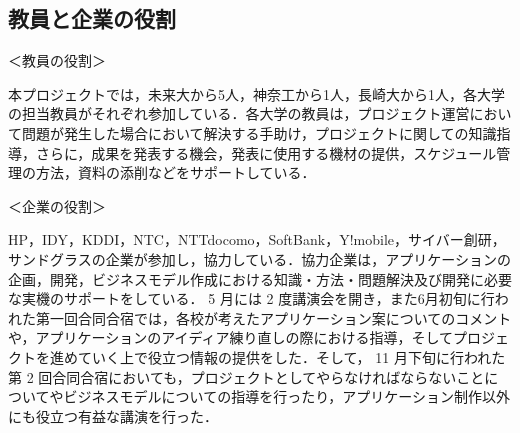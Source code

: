 \subsection{教員と企業の役割}
\par ＜教員の役割＞
\par 本プロジェクトでは，未来大から5人，神奈工から1人，長崎大から1人，各大学の担当教員がそれぞれ参加している．各大学の教員は，プロジェクト運営において問題が発生した場合において解決する手助け，プロジェクトに関しての知識指導，さらに，成果を発表する機会，発表に使用する機材の提供，スケジュール管理の方法，資料の添削などをサポートしている．

\par ＜企業の役割＞
\par
HP，IDY，KDDI，NTC，NTTdocomo，SoftBank，Y!mobile，サイバー創研，サンドグラスの企業が参加し，協力している．協力企業は，アプリケーションの企画，開発，ビジネスモデル作成における知識・方法・問題解決及び開発に必要な実機のサポートをしている． 5 月には 2 度講演会を開き，また6月初旬に行われた第一回合同合宿では，各校が考えたアプリケーション案についてのコメントや，アプリケーションのアイディア練り直しの際における指導，そしてプロジェクトを進めていく上で役立つ情報の提供をした．そして， 11 月下旬に行われた第 2 回合同合宿においても，プロジェクトとしてやらなければならないことについてやビジネスモデルについての指導を行ったり，アプリケーション制作以外にも役立つ有益な講演を行った．
